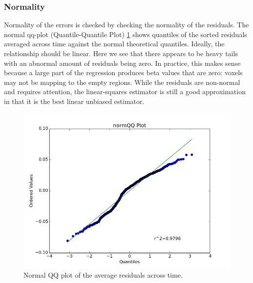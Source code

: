 \subsubsection{Normality}
Normality of the errors is checked by checking the normality of the residuals. 
The normal qq-plot (Quantile-Quantile Plot) \ref{fig:qqplot} shows quantiles
of the sorted residuals averaged across time against the normal theoretical 
quantiles. Ideally, the relationship should be linear. Here we see that there
appears to be heavy tails with an abnormal amount of residuals being zero. In
practice, this makes sense because a large part of the regression produces beta
values that are zero: voxels may not be mapping to the empty regions. While 
the residuals are non-normal and requires attention, the linear-squares 
estimator is still a good approximation in that it is the best linear unbiased 
estimator.

\begin{figure}[ht]
\centering
\includegraphics[scale=0.5]{figures/qqplot}  
\caption{Normal QQ plot of the average residuals across time.}
\label{fig:qqplot}
\end{figure}



